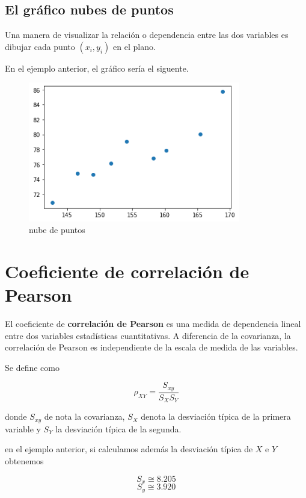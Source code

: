 \documentclass[
]{article}
\begin{document}
\hypertarget{el-gruxe1fico-nubes-de-puntos}{%
\subsection{El gráfico nubes de
puntos}\label{el-gruxe1fico-nubes-de-puntos}}

Una manera de visualizar la relación o dependencia entre las dos
variables es dibujar cada punto \((x_i, y_i)\) en el plano.

En el ejemplo anterior, el gráfico sería el siguente.

\begin{figure}
\centering
\includegraphics[width=3.64583in,height=\textheight]{cloud.png}
\caption{nube de puntos}
\end{figure}

\hypertarget{coeficiente-de-correlaciuxf3n-de-pearson}{%
\section{Coeficiente de correlación de
Pearson}\label{coeficiente-de-correlaciuxf3n-de-pearson}}

El coeficiente de \textbf{correlación de Pearson} es una medida de
dependencia lineal entre dos variables estadísticas cuantitativas. A
diferencia de la covarianza, la correlación de Pearson es independiente
de la escala de medida de las variables.

Se define como

\[\rho_{XY} = \frac{S_{xy}}{S_X S_Y}\]

donde \(S_{xy}\) de nota la covarianza, \(S_X\) denota la desviación
típica de la primera variable y \(S_Y\) la desviación típica de la
segunda.

en el ejemplo anterior, si calculamos además la desviación típica de
\(X\) e \(Y\) obtenemos

\[S_x \cong 8.205\] \[S_y \cong 3.920\]
\end{document}
